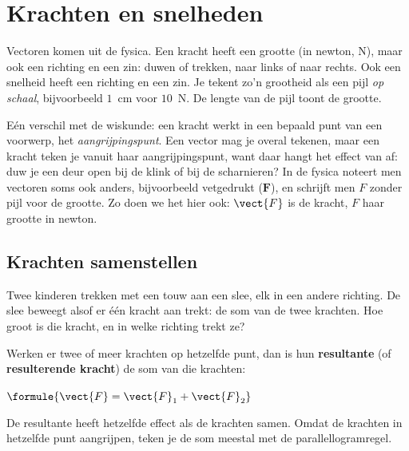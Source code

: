 \section{Krachten en snelheden}

Vectoren komen uit de fysica. Een kracht heeft een grootte (in newton, N), maar ook een richting en een zin: duwen of trekken, naar links of naar rechts. Ook een snelheid heeft een richting en een zin. Je tekent zo'n grootheid als een pijl \textit{op schaal}, bijvoorbeeld $1$~cm voor $10$~N. De lengte van de pijl toont de grootte.

Eén verschil met de wiskunde: een kracht werkt in een bepaald punt van een voorwerp, het \emph{aangrijpingspunt}. Een vector mag je overal tekenen, maar een kracht teken je vanuit haar aangrijpingspunt, want daar hangt het effect van af: duw je een deur open bij de klink of bij de scharnieren? In de fysica noteert men vectoren soms ook anders, bijvoorbeeld vetgedrukt ($\mathbf{F}$), en schrijft men $F$ zonder pijl voor de grootte. Zo doen we het hier ook: $\vect{F}$ is de kracht, $F$ haar grootte in newton.

\subsection{Krachten samenstellen}

Twee kinderen trekken met een touw aan een slee, elk in een andere richting. De slee beweegt alsof er één kracht aan trekt: de som van de twee krachten. Hoe groot is die kracht, en in welke richting trekt ze?

\begin{theorie}
Werken er twee of meer krachten op hetzelfde punt, dan is hun \textbf{\textcolor{accent}{resultante}} (of \textbf{\textcolor{accent}{resulterende kracht}}) de som van die krachten:

\vspace{1mm}
\qquad $\formule{\vect{F} = \vect{F}_1 + \vect{F}_2}$
\end{theorie}

De resultante heeft hetzelfde effect als de krachten samen. Omdat de krachten in hetzelfde punt aangrijpen, teken je de som meestal met de parallellogramregel.

